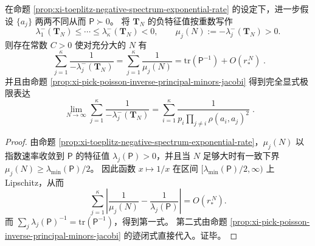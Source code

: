 \begin{corollary}[负谱倒数和的指数收敛与闭式极限]\label{cor:xi-toeplitz-negative-reciprocal-sum-limit}
在命题 \ref{prop:xi-toeplitz-negative-spectrum-exponential-rate} 的设定下，进一步假设 \(\{a_j\}\) 两两不同从而 \(\mathsf P\succ0\)。
将 \(\mathbf{T}_N\) 的负特征值按重数写作
\[
\lambda_1^-(\mathbf{T}_N)\le\cdots\le\lambda_\kappa^-(\mathbf{T}_N)<0,
\qquad
\mu_j(N):=-\lambda_j^-(\mathbf{T}_N)>0.
\]
则存在常数 \(C>0\) 使对充分大的 \(N\) 有
\[
\boxed{\;
\sum_{j=1}^{\kappa}\frac{1}{-\lambda_j^-(\mathbf{T}_N)}
=\sum_{j=1}^{\kappa}\frac{1}{\mu_j(N)}
=\mathrm{tr}(\mathsf P^{-1})+O(r_\ast^{\,N})\; } .
\]
并且由命题 \ref{prop:xi-pick-poisson-inverse-principal-minors-jacobi} 得到完全显式极限表达
\[
\boxed{\;
\lim_{N\to\infty}\sum_{j=1}^{\kappa}\frac{1}{-\lambda_j^-(\mathbf{T}_N)}
=\sum_{i=1}^{\kappa}\frac{1}{p_i\prod_{j\ne i}\rho(a_i,a_j)^2}\; } .
\]
\end{corollary}
\begin{proof}
由命题 \ref{prop:xi-toeplitz-negative-spectrum-exponential-rate}，\(\mu_j(N)\) 以指数速率收敛到 \(\mathsf P\) 的特征值 \(\lambda_j(\mathsf P)>0\)，并且当 \(N\) 足够大时有一致下界 \(\mu_j(N)\ge \lambda_{\min}(\mathsf P)/2\)。
因此函数 \(x\mapsto 1/x\) 在区间 \([\lambda_{\min}(\mathsf P)/2,\infty)\) 上 Lipschitz，从而
\[
\sum_{j=1}^{\kappa}\left|\frac{1}{\mu_j(N)}-\frac{1}{\lambda_j(\mathsf P)}\right|
=O(r_\ast^{\,N}).
\]
而 \(\sum_j \lambda_j(\mathsf P)^{-1}=\mathrm{tr}(\mathsf P^{-1})\)，得到第一式。
第二式由命题 \ref{prop:xi-pick-poisson-inverse-principal-minors-jacobi} 的迹闭式直接代入。证毕。
\end{proof}
